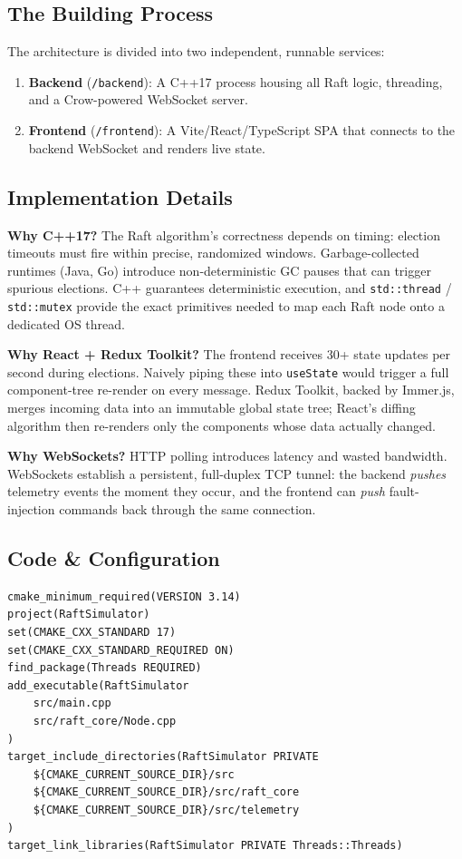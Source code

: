 \documentclass[11pt, a4paper]{article}
\begin{document}
\subsection{The Building Process}
The architecture is divided into two independent, runnable services:
\begin{enumerate}[leftmargin=*]
    \item \textbf{Backend} (\texttt{/backend}): A C++17 process housing
          all Raft logic, threading, and a Crow-powered WebSocket server.
    \item \textbf{Frontend} (\texttt{/frontend}): A Vite/React/TypeScript
          SPA that connects to the backend WebSocket and renders live state.
\end{enumerate}

\subsection{Implementation Details}
\textbf{Why C++17?} The Raft algorithm's correctness depends on timing:
election timeouts must fire within precise, randomized windows.
Garbage-collected runtimes (Java, Go) introduce non-deterministic GC pauses
that can trigger spurious elections. C++ guarantees deterministic execution,
and \texttt{std::thread} / \texttt{std::mutex} provide the exact primitives
needed to map each Raft node onto a dedicated OS thread.

\textbf{Why React + Redux Toolkit?} The frontend receives 30+ state updates
per second during elections. Naively piping these into \texttt{useState}
would trigger a full component-tree re-render on every message. Redux
Toolkit, backed by Immer.js, merges incoming data into an immutable global
state tree; React's diffing algorithm then re-renders only the components
whose data actually changed.

\textbf{Why WebSockets?} HTTP polling introduces latency and wasted
bandwidth. WebSockets establish a persistent, full-duplex TCP tunnel: the
backend \textit{pushes} telemetry events the moment they occur, and the
frontend can \textit{push} fault-injection commands back through the same
connection.

\subsection{Code \& Configuration}
\begin{lstlisting}[style=cppstyle, caption={backend/CMakeLists.txt}]
cmake_minimum_required(VERSION 3.14)
project(RaftSimulator)
set(CMAKE_CXX_STANDARD 17)
set(CMAKE_CXX_STANDARD_REQUIRED ON)
find_package(Threads REQUIRED)
add_executable(RaftSimulator
    src/main.cpp
    src/raft_core/Node.cpp
)
target_include_directories(RaftSimulator PRIVATE
    ${CMAKE_CURRENT_SOURCE_DIR}/src
    ${CMAKE_CURRENT_SOURCE_DIR}/src/raft_core
    ${CMAKE_CURRENT_SOURCE_DIR}/src/telemetry
)
target_link_libraries(RaftSimulator PRIVATE Threads::Threads)
\end{lstlisting}
\end{document}
